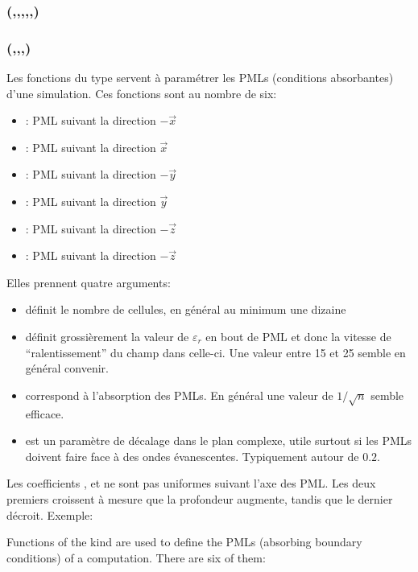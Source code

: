 \subsubsection[padding]{(,,,,,)}

\langswitch
{
}{
}

\subsubsection[pml\_X]{(,,,)}

\langswitch
{
	Les fonctions du type  servent à paramétrer les PMLs (conditions absorbantes) d'une simulation. Ces fonctions sont au nombre de six:
	\begin{itemize}
		\item {}: PML suivant la direction $-\vec x$
		\item {}: PML suivant la direction $\vec x$
		\item {}: PML suivant la direction $-\vec y$
		\item {}: PML suivant la direction $\vec y$
		\item {}: PML suivant la direction $-\vec z$
		\item {}: PML suivant la direction $-\vec z$
	\end{itemize}
	Elles prennent quatre arguments:
	\begin{itemize}
		\item {} définit le nombre de cellules, en général au minimum une dizaine
		\item {} définit grossièrement la valeur de $\varepsilon_r$ en bout de PML et donc la vitesse de ``ralentissement'' du champ dans celle-ci. Une valeur entre 15 et 25 semble en général convenir.
		\item {} correspond à l'absorption des PMLs. En général une valeur de $1/\sqrt{n}$ semble efficace.
		\item {} est un paramètre de décalage dans le plan complexe, utile surtout si les PMLs doivent faire face à des ondes évanescentes. Typiquement autour de $0.2$.
	\end{itemize}
	Les coefficients ,  et  ne sont pas uniformes suivant l'axe des PML. Les deux premiers croissent à mesure que la profondeur augmente, tandis que le dernier décroit. 
	Exemple:
}{
	Functions of the  kind are used to define the PMLs (absorbing boundary conditions) of a computation. There are six of them:
}
